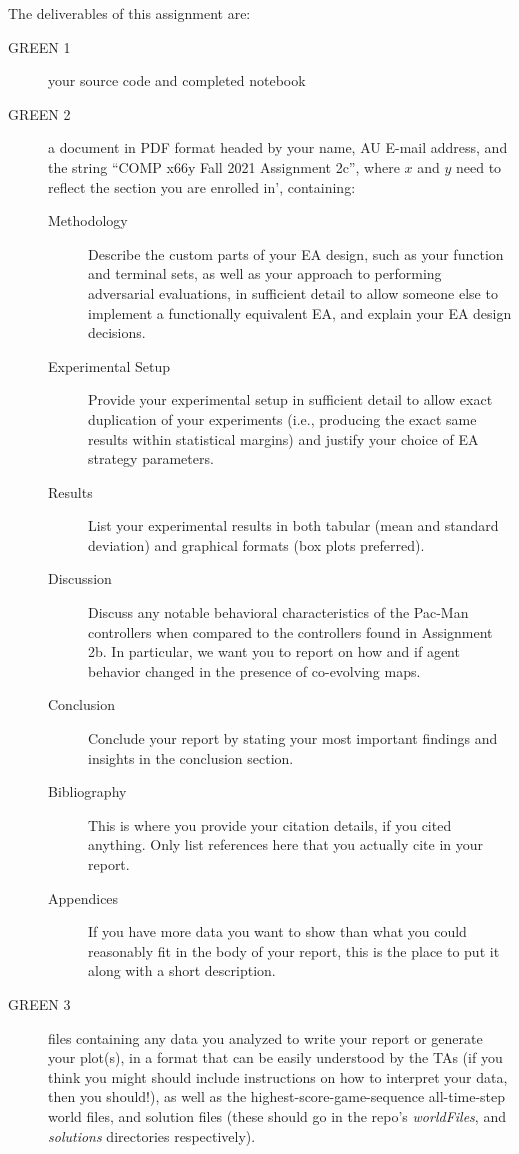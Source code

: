 \documentclass{article}
\begin{document}
The deliverables of this assignment are:
\begin{description}
\item[GREEN 1] your source code and completed notebook
\item[GREEN 2]  a document in PDF format headed by your name, AU E-mail address, and the string ``COMP x66y Fall 2021 Assignment 2c'', where $x$ and $y$ need to reflect the section you are enrolled in', containing:
  \begin{description}
  \item[Methodology] Describe the custom parts of your EA design, such as your function and terminal sets, as well as your approach to performing adversarial evaluations, in sufficient detail to allow someone else to implement a functionally equivalent EA, and explain your EA design decisions.
  \item[Experimental Setup] Provide your experimental setup in sufficient detail to allow exact duplication of your experiments (i.e., producing the exact same results within statistical margins) and justify your choice of EA strategy parameters.
  \item[Results] List your experimental results in both tabular (mean and standard deviation) and graphical formats (box plots preferred).
  \item[Discussion] Discuss any notable behavioral characteristics of the Pac-Man controllers when compared to the controllers found in Assignment 2b. In particular, we want you to report on how and if agent behavior changed in the presence of co-evolving maps.
  \item[Conclusion] Conclude your report by stating your most important findings and insights in the conclusion section. 
  \item[Bibliography] This is where you provide your citation details, if you cited anything. Only list references here that you actually cite in your report.
  \item[Appendices] If you have more data you want to show than what you could reasonably fit in the body of your report, this is the place to put it along with a short description.
  \end{description}
\item[GREEN 3] files containing any data you analyzed to write your report or generate your plot(s), in a format that can be easily understood by the TAs (if you think you might should include instructions on how to interpret your data, then you should!), as well as the highest-score-game-sequence all-time-step world files, and solution files (these should go in the repo's \emph{worldFiles}, and \emph{solutions} directories respectively).

\end{description}
\end{document}
